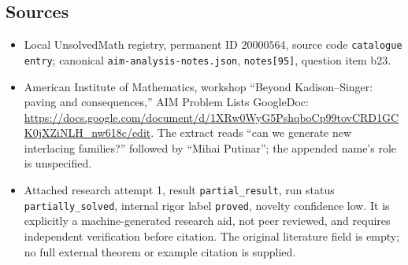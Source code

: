 \documentclass[11pt]{article}
\begin{document}
\subsection{Sources}
\begin{itemize}
\item Local UnsolvedMath registry, permanent ID $20000564$, source code \texttt{catalogue entry}; canonical \texttt{aim-analysis-notes.json}, \texttt{notes[95]}, question item b23.
\item American Institute of Mathematics, workshop ``Beyond Kadison--Singer: paving and consequences,'' AIM Problem Lists GoogleDoc: \url{https://docs.google.com/document/d/1XRw0WyG5PshqboCp99tovCRD1GCK0jXZiNLH_nw618c/edit}. The extract reads ``can we generate new interlacing families?'' followed by ``Mihai Putinar''; the appended name's role is unspecified.
\item Attached research attempt 1, result \texttt{partial\_result}, run status \texttt{partially\_solved}, internal rigor label \texttt{proved}, novelty confidence low. It is explicitly a machine-generated research aid, not peer reviewed, and requires independent verification before citation. The original literature field is empty; no full external theorem or example citation is supplied.
\end{itemize}
\end{document}
